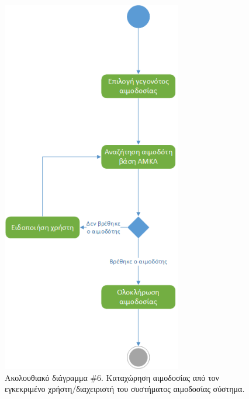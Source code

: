 				
		\begin{figure}[H]
		    \centering
		    \includegraphics[width=0.7\textwidth]{CompleteDonation.png}
		    \caption{Ακολουθιακό διάγραμμα \#6. Καταχώρηση αιμοδοσίας από τον  εγκεκριμένο χρήστη/διαχειριστή του συστήματος αιμοδοσίας σύστημα.}
		    \label{fig:complete}
		\end{figure}
		
